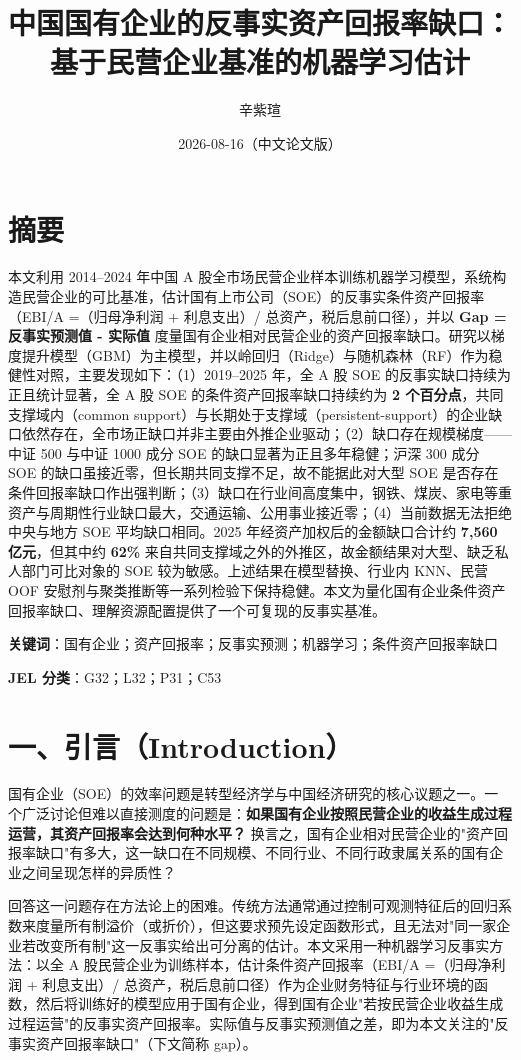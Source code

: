 \documentclass[11pt,a4paper]{ctexart}
\title{中国国有企业的反事实资产回报率缺口：基于民营企业基准的机器学习估计}
\author{辛紫瑄}
\date{2026-08-16（中文论文版）}
\begin{document}
\maketitle
\section{摘要}

本文利用 2014--2024 年中国 A 股全市场民营企业样本训练机器学习模型，系统构造民营企业的可比基准，估计国有上市公司（SOE）的反事实条件资产回报率（EBI/A =（归母净利润 + 利息支出）/ 总资产，税后息前口径），并以 \textbf{Gap = 反事实预测值 - 实际值} 度量国有企业相对民营企业的资产回报率缺口。研究以梯度提升模型（GBM）为主模型，并以岭回归（Ridge）与随机森林（RF）作为稳健性对照，主要发现如下：（1）2019--2025 年，全 A 股 SOE 的反事实缺口持续为正且统计显著，全 A 股 SOE 的条件资产回报率缺口持续约为 \textbf{2 个百分点}，共同支撑域内（common support）与长期处于支撑域（persistent-support）的企业缺口依然存在，全市场正缺口并非主要由外推企业驱动；（2）缺口存在规模梯度------中证 500 与中证 1000 成分 SOE 的缺口显著为正且多年稳健；沪深 300 成分 SOE 的缺口虽接近零，但长期共同支撑不足，故不能据此对大型 SOE 是否存在条件回报率缺口作出强判断；（3）缺口在行业间高度集中，钢铁、煤炭、家电等重资产与周期性行业缺口最大，交通运输、公用事业接近零；（4）当前数据无法拒绝中央与地方 SOE 平均缺口相同。2025 年经资产加权后的金额缺口合计约 \textbf{7,560 亿元}，但其中约 \textbf{62\%} 来自共同支撑域之外的外推区，故金额结果对大型、缺乏私人部门可比对象的 SOE 较为敏感。上述结果在模型替换、行业内 KNN、民营 OOF 安慰剂与聚类推断等一系列检验下保持稳健。本文为量化国有企业条件资产回报率缺口、理解资源配置提供了一个可复现的反事实基准。

\textbf{关键词}：国有企业；资产回报率；反事实预测；机器学习；条件资产回报率缺口

\textbf{JEL 分类}：G32；L32；P31；C53

\section{一、引言（Introduction）}

国有企业（SOE）的效率问题是转型经济学与中国经济研究的核心议题之一。一个广泛讨论但难以直接测度的问题是：\textbf{如果国有企业按照民营企业的收益生成过程运营，其资产回报率会达到何种水平？} 换言之，国有企业相对民营企业的"资产回报率缺口"有多大，这一缺口在不同规模、不同行业、不同行政隶属关系的国有企业之间呈现怎样的异质性？

回答这一问题存在方法论上的困难。传统方法通常通过控制可观测特征后的回归系数来度量所有制溢价（或折价），但这要求预先设定函数形式，且无法对"同一家企业若改变所有制"这一反事实给出可分离的估计。本文采用一种机器学习反事实方法：以全 A 股民营企业为训练样本，估计条件资产回报率（EBI/A =（归母净利润 + 利息支出）/ 总资产，税后息前口径）作为企业财务特征与行业环境的函数，然后将训练好的模型应用于国有企业，得到国有企业"若按民营企业收益生成过程运营"的反事实资产回报率。实际值与反事实预测值之差，即为本文关注的"反事实资产回报率缺口"（下文简称 gap）。
\end{document}
